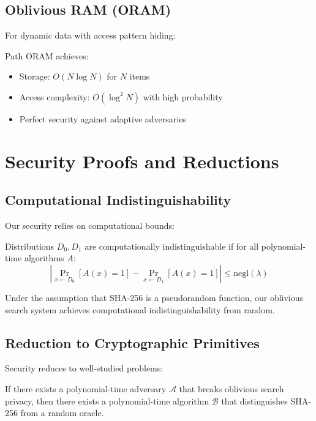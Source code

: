 \subsection{Oblivious RAM (ORAM)}

For dynamic data with access pattern hiding:

\begin{theorem}
Path ORAM achieves:
\begin{itemize}
\item Storage: $O(N \log N)$ for $N$ items
\item Access complexity: $O(\log^2 N)$ with high probability
\item Perfect security against adaptive adversaries
\end{itemize}
\end{theorem}

\section{Security Proofs and Reductions}

\subsection{Computational Indistinguishability}

Our security relies on computational bounds:

\begin{definition}
Distributions $D_0, D_1$ are computationally indistinguishable if for all polynomial-time algorithms $A$:
$$\left| \Pr_{x \leftarrow D_0}[A(x) = 1] - \Pr_{x \leftarrow D_1}[A(x) = 1] \right| \leq \text{negl}(\lambda)$$
\end{definition}

\begin{theorem}
Under the assumption that SHA-256 is a pseudorandom function, our oblivious search system achieves computational indistinguishability from random.
\end{theorem}

\subsection{Reduction to Cryptographic Primitives}

Security reduces to well-studied problems:

\begin{theorem}
If there exists a polynomial-time adversary $\mathcal{A}$ that breaks oblivious search privacy, then there exists a polynomial-time algorithm $\mathcal{B}$ that distinguishes SHA-256 from a random oracle.
\end{theorem}

